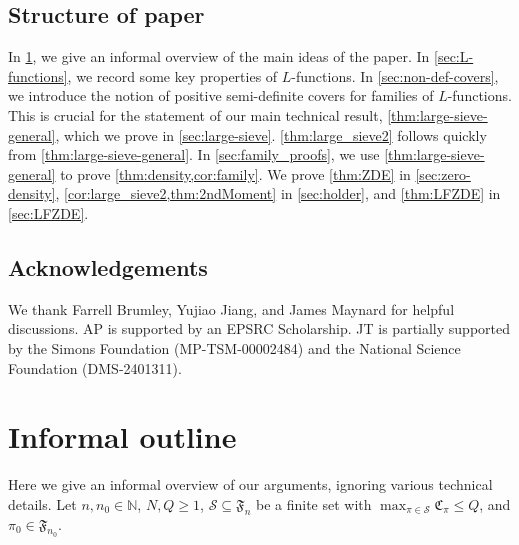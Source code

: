 \documentclass[11pt]{amsart}
\theoremstyle{remark}
\numberwithin{equation}{section}
\newcommand{\F}{\mathfrak{F}}
\newcommand{\mS}{\mathcal{S}}
\begin{document}
\subsection*{Structure of paper} In \cref{sec:InformalOutline}, we give an informal overview of the main ideas of the paper.  In \cref{sec:L-functions}, we record some key properties of $L$-functions.  In \cref{sec:non-def-covers}, we introduce the notion of positive semi-definite covers for families of $L$-functions. This is  crucial for the statement of our main technical result, \cref{thm:large-sieve-general}, which we prove in \cref{sec:large-sieve}. \cref{thm:large_sieve2} follows quickly from \cref{thm:large-sieve-general}.  In \cref{sec:family_proofs}, we use \cref{thm:large-sieve-general} to prove \cref{thm:density,cor:family}. We prove \cref{thm:ZDE} in \cref{sec:zero-density}, \cref{cor:large_sieve2,thm:2ndMoment} in \cref{sec:holder}, and \cref{thm:LFZDE} in \cref{sec:LFZDE}.

\subsection*{Acknowledgements}
We thank Farrell Brumley, Yujiao Jiang, and James Maynard for helpful discussions. AP is supported by an EPSRC Scholarship. JT is partially supported by the Simons Foundation (MP-TSM-00002484) and the National Science Foundation (DMS-2401311).


\section{Informal outline}
\label{sec:InformalOutline}

Here we give an informal overview of our arguments, ignoring various technical details. Let $n, n_0 \in \mathbb{N}$, $N, Q \ge 1$, $\mS \subseteq \F_n$ be a finite set with $\max_{\pi \in \mS} \mathfrak{C}_{\pi} \le Q$, and $\pi_0 \in \F_{n_0}$.
\end{document}
